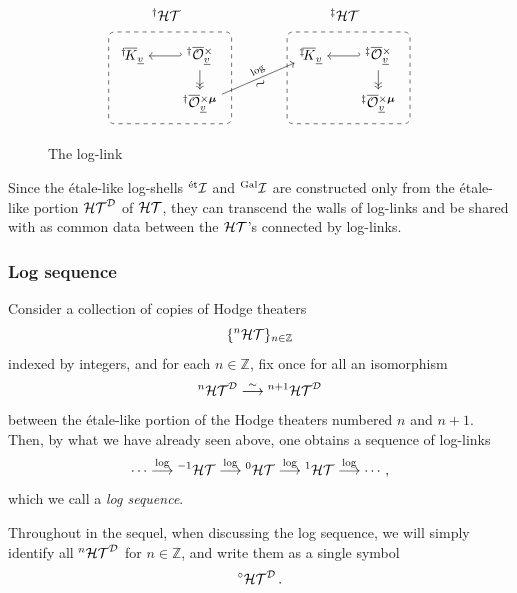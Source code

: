\documentclass[12pt, reqno, a4paper]{amsart}
\def\udl#1{\underline{#1}} %
\def\longto{\longrightarrow}
\def\simlongto{\stackrel{\sim}{\longrightarrow}} %
\def\bZ{\mathbb{Z}} %
\def\cD{{\mathcal{D}}}
\def\uv{\udl{v}} %
\def\et{\textrm{\'et}}
\DeclareMathOperator{\Gal}{Gal}
\begin{document}
\begin{figure}[htbp]
$$
\begin{tikzpicture}
\coordinate (a) at (0,0);
\node (-1k) at ([shift={(0,1.2)}]a) {$\oK[\dag]_{\uv}$};
\node (-1Ox) at ([shift={(1.7,1.2)}]a) {$\oOOx[\dag]_{\uv}$};
\node (-1Oxmu) at ([shift={(1.7,0)}]a) {$\oOOxmu[\dag]_{\uv}$};
\draw[{Hooks[left]}->] (-1Ox) --(-1k);
\draw[->>] (-1Ox) --(-1Oxmu);
\draw[dashed, rounded corners] ([shift={(-.6,-.5)}]a) rectangle([shift={(2.5, 1.8)}]a);
\node at ([shift={(0.85,2.2)}]a) {$\HT[\dag]$};
%
\coordinate (a) at (4.5,0);
\node (0k) at ([shift={(0,1.2)}]a) {$\oK[\ddag]_{\uv}$};
\node (0Ox) at ([shift={(1.7,1.2)}]a) {$\oOOx[\ddag]_{\uv}$};
\node (0Oxmu) at ([shift={(1.7,0)}]a) {$\oOOxmu[\ddag]_{\uv}$};
\draw[{Hooks[left]}->] (0Ox) --(0k);
\draw[->>] (0Ox) --(0Oxmu);
\draw[dashed, rounded corners] ([shift={(-.6,-.5)}]a) rectangle([shift={(2.5, 1.8)}]a);
\node at ([shift={(0.85,2.2)}]a) {$\HT[\ddag]$};
\draw[->] (-1Oxmu) -- node[auto, rotate=30, pos=0.7]{$\scriptstyle \log$} node[auto=right, rotate=30, pos=0.36]{$\sim$} (0k);
\end{tikzpicture}
$$
\caption{The log-link}
\label{fig:LogLink}
\end{figure}

\begin{rem}\label{rem:underlyingBHT}
Since the \'etale-like log-shells $\LS[\et]$ and $\LS[\Gal]$ are constructed only from the \'etale-like portion $\HT^{\cD}$ of $\HT$, they can transcend the walls of log-links and be shared with as common data between the $\HT$'s connected by log-links.
\end{rem}

\subsubsection{Log sequence}\label{subsub:logSequence}
Consider a collection of copies of Hodge theaters
$$
\{\HT[n]\}_{n\in\bZ}
$$
indexed by integers, and for each $n\in\bZ$, fix once for all an isomorphism
$$
\HT[n]^{\cD}\simlongto\HT[n+1]^{\cD}
$$
between the \'etale-like portion of the Hodge theaters numbered $n$ and $n+1$.
Then, by what we have already seen above, one obtains a sequence of log-links
$$
\cdots\stackrel{\log}{\longto}\HT[-1]\stackrel{\log}{\longto}\HT[0]\stackrel{\log}{\longto}\HT[1]\stackrel{\log}{\longto}\cdots,
$$
which we call a \emph{log sequence}.

\begin{ntn}\label{ntn: etHT} %
Throughout in the sequel, when discussing the log sequence, we will simply identify all $\HT[n]^{\cD}$ for $n\in\bZ$, and write them as a single symbol
$$
\HT[\circ]^{\cD}.
$$
\end{ntn}
\end{document}
